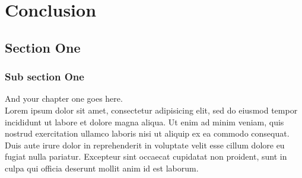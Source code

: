 \chapter{Conclusion}%
\label{chap:chap7}

\section{Section One}
\label{section:chap7:sec1}

  \subsection{Sub section One}
  And your chapter one goes here\@. ~\\
  Lorem ipsum dolor sit amet, consectetur adipisicing elit, sed do eiusmod
  tempor incididunt ut labore et dolore magna aliqua. Ut enim ad minim veniam,
  quis nostrud exercitation ullamco laboris nisi ut aliquip ex ea commodo
  consequat. Duis aute irure dolor in reprehenderit in voluptate velit esse
  cillum dolore eu fugiat nulla pariatur. Excepteur sint occaecat cupidatat non
  proident, sunt in culpa qui officia deserunt mollit anim id est laborum.


